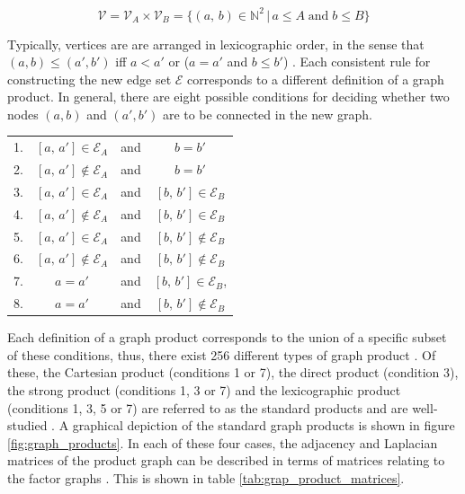 \begin{equation}
    \mathcal{V} = \mathcal{V}_A \times \mathcal{V}_B = \{(a, \, b) \in \mathbb{N}^2 \, | \, a \leq A \; \text{and} \; b \leq B \}
\end{equation}


Typically, vertices are are arranged in lexicographic order, in the sense that $(a, b) \leq (a', b')$ iff $a < a'$ or ($a = a'$ and $b \leq b'$) \citep{Harzheim2005}. Each consistent rule for constructing the new edge set $\mathcal{E}$ corresponds to a different definition of a graph product. In general, there are eight possible conditions for deciding whether two nodes $(a, b)$ and $(a', b')$ are to be connected in the new graph.

\begin{table}[h]
\def\arraystretch{1.5}
\centering
\begin{tabular}{lclc}
1. & $[a, \, a'] \in \mathcal{E}_A$ & and &  $b = b'$  \\
2. & $[a, \, a'] \notin \mathcal{E}_A$  & and &  $b = b'$  \\
3. & $[a, \, a'] \in \mathcal{E}_A$ & and &  $[b, \, b'] \in \mathcal{E}_B$ \\
4. & $[a, \, a'] \notin \mathcal{E}_A$ & and &  $[b, \, b'] \in \mathcal{E}_B$  \\
5. & $[a, \, a'] \in \mathcal{E}_A$ & and & $[b, \, b'] \notin \mathcal{E}_B$  \\
6. & $[a, \, a'] \notin \mathcal{E}_A$ & and & $[b, \, b'] \notin \mathcal{E}_B$  \\
7. & $a = a'$ & and & $[b, \, b'] \in \mathcal{E}_B$,  \\
8. & $a = a'$ & and &  $[b, \, b'] \notin \mathcal{E}_B$ 
\end{tabular}
\end{table}



Each definition of a graph product corresponds to the union of a specific subset of these conditions, thus, there exist 256 different types of graph product \citep{Barik2015}. Of these, the Cartesian product (conditions 1 or 7), the direct product (condition 3), the strong product (conditions 1, 3 or 7) and the lexicographic product (conditions 1, 3, 5 or 7) are referred to as the standard products and are well-studied \citep{Imrich2000}. A graphical depiction of the standard graph products is shown in figure \ref{fig:graph_products}. In each of these four cases, the adjacency and Laplacian matrices of the product graph can be described in terms of matrices relating to the factor graphs \citep{Fiedler1973, Barik2018}. This is shown in table \ref{tab:grap_product_matrices}. 

